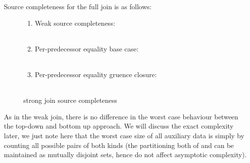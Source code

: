 Source completeness for the full join is as follows:
\begin{figure}[H]
\begin{enumerate}
	\item Weak source completeness:\\
	\\
	\item Per-predecessor equality base case:\\
	\\
	\item Per-predecessor equality gruence closure:\\
	\\
\end{enumerate}
\caption{strong join source completeness}
\label{strong_join_source_completeness}
\end{figure}


As in the weak join, there is no difference in the worst case behaviour between the top-down and bottom up approach.
We will discuss the exact complexity later, we just note here that the worst case size of all auxiliary data is 
simply by counting all possible pairs of both kinds 
(the partitioning both of  and  can be maintained as mutually disjoint sets, hence do not affect asymptotic complexity).

